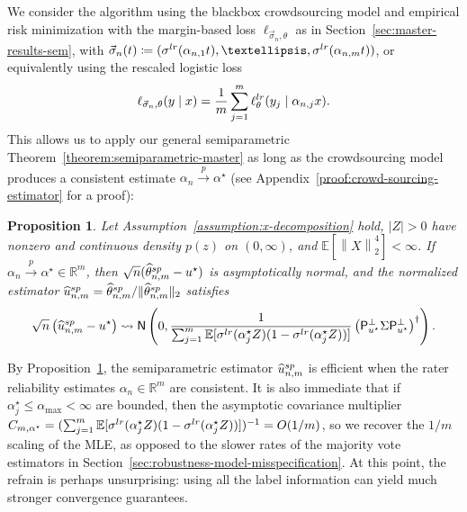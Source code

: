 \documentclass[11pt]{article}
\newcommand{\cc}[1]{\textcolor{cc}{[CC: #1]}}
\newcommand{\Ep}{\mathbb{E}}
\newcommand{\E}{\mathbb{E}}
\newcommand{\R}{\mathbb{R}} %
\newcommand{\prn}[1]{\left({#1}\right)} %
\newcommand{\norm}[1]{\left\|{#1}\right\|} %
\newcommand{\what}[1]{\widehat{#1}}
\newcommand{\normal}{\mathsf{N}}
\newcommand{\lr}{^{\textup{lr}}}
\newcommand{\sem}{^{\textup{sp}}}
\newcommand{\proj}{\mathsf{P}}
\newcommand{\loss}{\ell}
\newcommand{\ltwo}[1]{\norm{#1}_2} %
\newcommand{\norms}[1]{\|{#1}\|} %
\newcommand{\ltwos}[1]{\norms{#1}_2} %
\newcommand{\<}{\langle} %
\renewcommand{\>}{\rangle}
\newcommand{\cd}{\rightsquigarrow}
\newcommand{\cp}{\stackrel{p}{\rightarrow}}
\newcommand{\defeq}{\coloneqq}
\newcommand{\opt}{^\star}
\newcommand{\spe}{\what{\theta}\sem_{n,m}} %
\newtheorem{proposition}{Proposition}
\begin{document}

We consider the algorithm using the blackbox crowdsourcing model and
empirical risk minimization with the margin-based loss
$\loss_{\vec{\sigma}_n, \theta}$ as in Section~\ref{sec:master-results-sem},
with
$\vec{\sigma}_n(t)
\defeq (\sigma\lr(\alpha_{n,1}t),\dots, \sigma\lr(\alpha_{n,m}t))$,
or equivalently using the rescaled logistic loss
\begin{align*}
  \loss_{\vec{\sigma}_n, \theta}(y \mid x)
  = \frac{1}{m} \sum_{j=1}^m \loss\lr_\theta (y_j \mid \alpha_{n,j} x) .
\end{align*}
This allows us to apply our general semiparametric
Theorem~\ref{theorem:semiparametric-master} as long as the crowdsourcing
model produces a consistent estimate $\alpha_n \cp \alpha^\star$ (see
Appendix~\ref{proof:crowd-sourcing-estimator} for a proof):
\begin{proposition}
  \label{prop:crowd-sourcing-estimator}
  Let Assumption~\ref{assumption:x-decomposition} hold, $|Z| > 0$ have
  nonzero and continuous density $p(z)$ on $(0, \infty)$, and $\Ep
  [\ltwo{X}^4] < \infty$. If $\alpha_n \cp \alpha\opt \in \R^m$, then
  $\sqrt{n}(\spe - u\opt)$ is asymptotically normal, and the normalized
  estimator $\what{u}\sem_{n,m} = \spe / \ltwos{\spe}$ satisfies
  \begin{equation*}
    \sqrt{n} \prn{\what{u}\sem_{n,m} - u\opt}
    \cd \normal\prn{0,
      \frac{1}{\sum_{j = 1}^m \E[\sigma\lr(\alpha_j\opt Z)
          (1 - \sigma\lr(\alpha_j\opt Z))]}
      \prn{\proj_{u\opt}^\perp \Sigma \proj_{u\opt}^\perp}^\dagger}.
  \end{equation*}
\end{proposition}

By Proposition~\ref{prop:crowd-sourcing-estimator}, the semiparametric
estimator $\what{u}\sem_{n,m}$ is efficient when the rater reliability
estimates $\alpha_n \in \R^m$ are consistent.  It is also immediate that if
$\alpha_j\opt \le \alpha_{\max} < \infty$ are bounded, then the asymptotic
covariance multiplier $C_{m,\alpha\opt} = (\sum_{j = 1}^m
\E[\sigma\lr(\alpha_j\opt Z) (1 - \sigma\lr(\alpha_j\opt Z))])^{-1} =
O(1/m)$, so we recover the $1/m$ scaling of the MLE, as opposed to the
slower rates of the majority vote estimators in
Section~\ref{sec:robustness-model-misspecification}.  At this point, the
refrain is perhaps unsurprising: using all the label information can yield
much stronger convergence guarantees.
\end{document}
